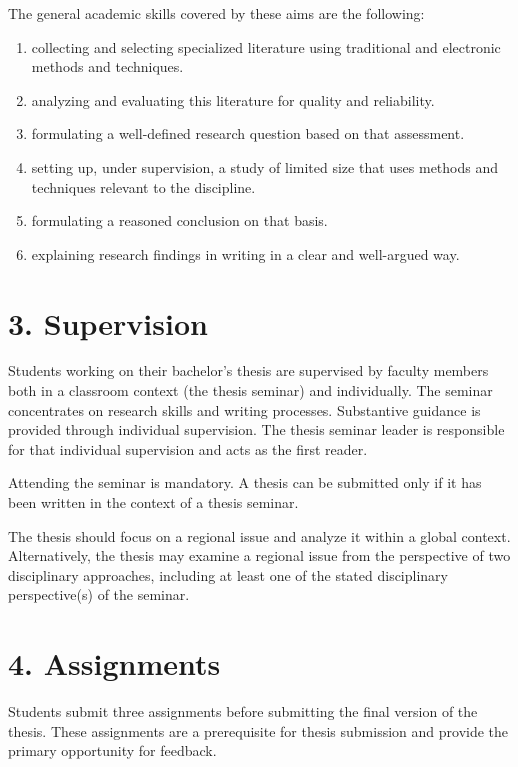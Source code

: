 \documentclass[11pt,a4paper]{article}
\begin{document}
The general academic skills covered by these aims are the following:
\begin{enumerate}[label=\alph*)]
    \item collecting and selecting specialized literature using traditional and electronic methods and techniques.
    \item analyzing and evaluating this literature for quality and reliability.
    \item formulating a well-defined research question based on that assessment.
    \item setting up, under supervision, a study of limited size that uses methods and techniques relevant to the discipline.
    \item formulating a reasoned conclusion on that basis.
    \item explaining research findings in writing in a clear and well-argued way.
\end{enumerate}

\section{3. Supervision}

Students working on their bachelor's thesis are supervised by faculty members both in a classroom context (the thesis seminar) and individually. The seminar concentrates on research skills and writing processes. Substantive guidance is provided through individual supervision. The thesis seminar leader is responsible for that individual supervision and acts as the first reader.

Attending the seminar is mandatory. A thesis can be submitted only if it has been written in the context of a thesis seminar.

The thesis should focus on a regional issue and analyze it within a global context. Alternatively, the thesis may examine a regional issue from the perspective of two disciplinary approaches, including at least one of the stated disciplinary perspective(s) of the seminar.

\section{4. Assignments}

Students submit three assignments before submitting the final version of the thesis. These assignments are a prerequisite for thesis submission and provide the primary opportunity for feedback.
\end{document}
